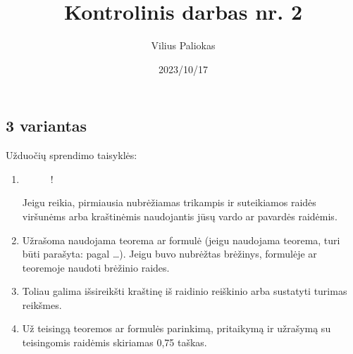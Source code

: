 \documentclass[a4paper]{article}
\title{Kontrolinis darbas nr. 2}
\author{Vilius Paliokas}
\date{2023/10/17}
\newcommand{\germanqq}[1]{{\selectlanguage{german}\glqq#1\grqq\selectlanguage{english}}}
\begin{document}
\thispagestyle{fancy}

\subsection*{3 variantas}

Užduočių sprendimo taisyklės:

\begin{enumerate}[label= (\alph*)]

      \item

            \begin{adjustbox}{minipage={\linewidth}, valign=t}

                  \begin{wrapfigure}{t}{0.17\linewidth}

                        \begin{resizebox}{0.17\textwidth}{!}{
                                    }
                        \end{resizebox}
                        \vspace{-2\baselineskip}

                  \end{wrapfigure}

                  \vspace*{0.15em}

                  Jeigu reikia, pirmiausia nubrėžiamas trikampis ir suteikiamos
                  raidės viršunėms arba kraštinėmis naudojantis jūsų vardo ar
                  pavardės raidėmis.
            \end{adjustbox}

      \item \parbox{0.8\textwidth}{
                  Užrašoma naudojama teorema ar formulė (jeigu
                  naudojama teorema, turi būti parašyta: \germanqq{pagal
                        \ldots }). Jeigu buvo nubrėžtas brėžinys, formulėje ar
                  teoremoje naudoti brėžinio raides.
            }

      \item \parbox{0.7\textwidth}{
                  Toliau galima išsireikšti kraštinę iš
                  raidinio reiškinio arba sustatyti turimas
                  reikšmes.
            }

      \item \parbox{0.7\textwidth}{ Už teisingą teoremos ar formulės parinkimą,
                  pritaikymą ir užrašymą su teisingomis raidėmis skiriamas 0,75
                  taškas.}
\end{enumerate}
\end{document}
